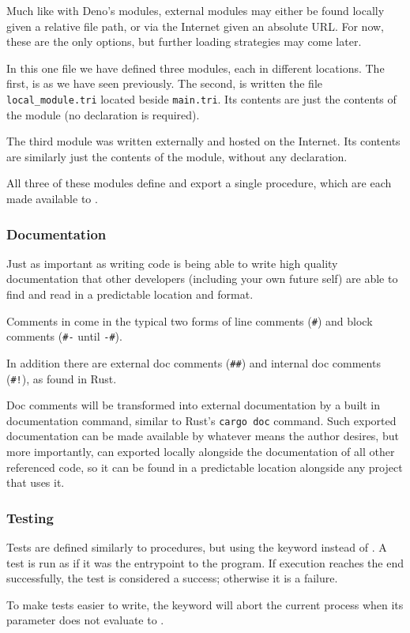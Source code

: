 Much like with Deno's modules, external modules may either be found locally
given a relative file path, or via the Internet given an absolute URL\@. For
now, these are the only options, but further loading strategies may come
later.


In this one file we have defined three modules, each in different locations.
The first,  is as we have seen previously. The second,
 is written the file \texttt{local\_module.tri} located
beside \texttt{main.tri}. Its contents are just the contents of the module
(no  declaration is required).


The third module was written externally and hosted on the Internet.
Its contents are similarly just the contents of the module, without
any declaration.


All three of these modules define and export a single procedure, which
are each made available to .

\subsubsection{Documentation}

Just as important as writing code is being able to write high quality
documentation that other developers (including your own future self)
are able to find and read in a predictable location and format.

Comments in \Trilogy{} come in the typical two forms of line comments
(\texttt{\#}) and block comments (\texttt{\#-} until \texttt{-\#}).

In addition there are external doc comments (\texttt{\#\#}) and internal
doc comments (\texttt{\#!}), as found in Rust.


Doc comments will be transformed into external documentation by a built
in documentation command, similar to Rust's \texttt{cargo doc} command.
Such exported documentation can be made available by whatever means the
author desires, but more importantly, can exported locally alongside the
documentation of all other referenced code, so it can be found in a
predictable location alongside any project that uses it.

\subsubsection{Testing}

Tests are defined similarly to procedures, but using the keyword 
instead of . A test is run as if it was the entrypoint to the
program. If execution reaches the end successfully, the test is
considered a success; otherwise it is a failure.


To make tests easier to write, the  keyword will abort the
current process when its parameter does not evaluate to .
